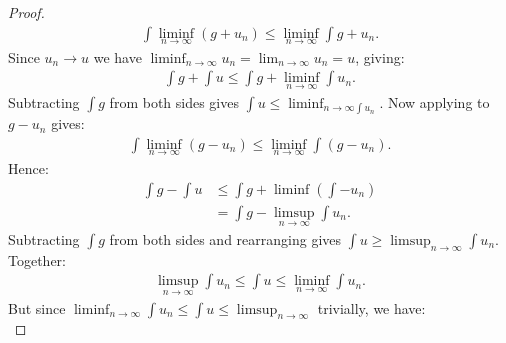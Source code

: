 \begin{proof}
            \begin{equation*}
            \begin{split}
                \int \liminf_{n \rightarrow \infty}(g + u_n) \leq \liminf_{n \rightarrow \infty}\int g + u_n. 
            \end{split}
            \end{equation*}
        Since $u_n \rightarrow u$ we have $\liminf_{n \rightarrow \infty} u_n = \lim_{n \rightarrow \infty}u_n = u$, giving:
            \begin{equation*}
            \begin{split}
                \int g + \int u \leq \int g + \liminf_{n \rightarrow \infty}\int u_n.
            \end{split}
            \end{equation*}
        Subtracting $\int g$ from both sides gives $\int u \leq \liminf_{n \rightarrow \infty \int u_n}$. Now applying  to $g - u_n$ gives:
            \begin{equation*}
            \begin{split}
                \int \liminf_{n \rightarrow \infty}(g - u_n) \leq \liminf_{n \rightarrow \infty} \int (g - u_n).
            \end{split}
            \end{equation*}
        Hence:
            \begin{equation*}
            \begin{split}
                \int g - \int u 
                & \leq \int g + \liminf \left( \int -u_n \right) \\
                & = \int g - \limsup_{n \rightarrow \infty}\int u_n.
            \end{split}
            \end{equation*}
        Subtracting $\int g$ from both sides and rearranging gives $\int u \geq \limsup_{n \rightarrow \infty}\int u_n$. Together:
            \begin{equation*}
            \begin{split}
                \limsup_{n \rightarrow \infty} \int u_n \leq \int u \leq \liminf_{n \rightarrow \infty} \int u_n.
            \end{split}
            \end{equation*}
        But since $\liminf_{n \rightarrow \infty} \int u_n \leq \int u \leq \limsup_{n \rightarrow \infty}$ trivially, we have:
            \begin{equation*}

\end{equation*}
\end{proof}

